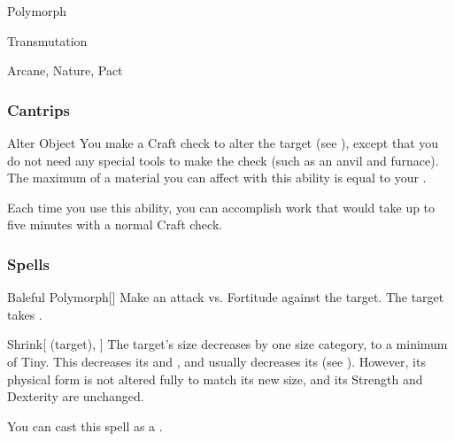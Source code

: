 \newpage
\begin{spellsection}{Polymorph}

\begin{spellheader}
\end{spellheader}


 Transmutation

 Arcane, Nature, Pact

\subsubsection{Cantrips}


\begin{freeability}{Alter Object}
You make a Craft check to alter the target (see ), except that you do not need any special tools to make the check (such as an anvil and furnace).
The maximum  of a material you can affect with this ability is equal to your .

Each time you use this ability, you can accomplish work that would take up to five minutes with a normal Craft check.
\end{freeability}

\end{spellsection}


\subsubsection{Spells}


\lowercase{\hypertarget{spell:Baleful Polymorph}{}}\label{spell:Baleful Polymorph}
\begin{freeability}[\nth{1}]{\hypertarget{spell:Baleful Polymorph}{Baleful Polymorph}}[]
Make an attack vs. Fortitude against the target.
\hit The target takes .
\end{freeability}
\vspace{0.25em}



\lowercase{\hypertarget{spell:Shrink}{}}\label{spell:Shrink}
\begin{attuneability}[\nth{1}]{\hypertarget{spell:Shrink}{Shrink}}[ (target), ]
The target's size decreases by one size category, to a minimum of Tiny.
This decreases its  and , and usually decreases its  (see ).
However, its physical form is not altered fully to match its new size, and its Strength and Dexterity are unchanged.

You can cast this spell as a .
\end{attuneability}
\vspace{0.25em}



